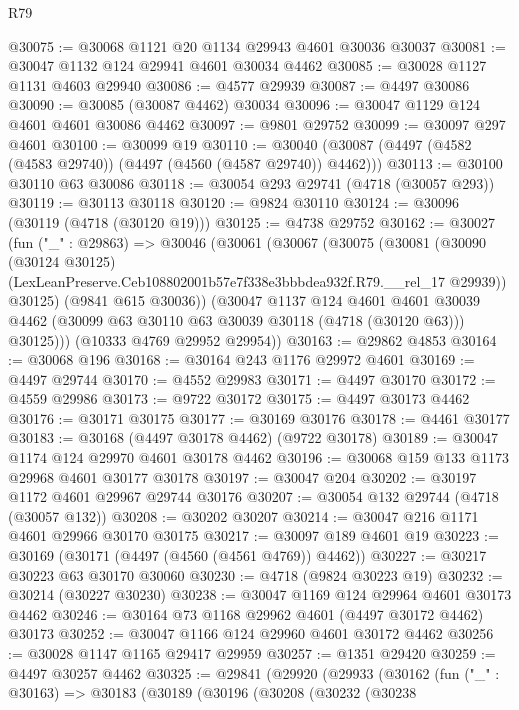 \begin{lexlean}{R79}
\begin{coremodule}
@30075 := @30068 @1121 @20 @1134 @29943 @4601 @30036 @30037
@30081 := @30047 @1132 @124 @29941 @4601 @30034 @4462
@30085 := @30028 @1127 @1131 @4603 @29940
@30086 := @4577 @29939
@30087 := @4497 @30086
@30090 := @30085 (@30087 @4462) @30034
@30096 := @30047 @1129 @124 @4601 @4601 @30086 @4462
@30097 := @9801 @29752
@30099 := @30097 @297 @4601
@30100 := @30099 @19
@30110 := @30040 (@30087 (@4497 (@4582 (@4583 @29740)) (@4497 (@4560 (@4587 @29740)) @4462)))
@30113 := @30100 @30110 @63 @30086
@30118 := @30054 @293 @29741 (@4718 (@30057 @293))
@30119 := @30113 @30118
@30120 := @9824 @30110
@30124 := @30096 (@30119 (@4718 (@30120 @19)))
@30125 := @4738 @29752
@30162 := @30027
    (fun ("_" : @29863) =>
    @30046
      (@30061
        (@30067
          (@30075
            (@30081
              (@30090
                (@30124 @30125)
                (LexLeanPreserve.Ceb108802001b57e7f338e3bbbdea932f.R79.__rel_17 @29939))
              @30125)
            (@9841 @615 @30036))
          (@30047
            @1137
            @124
            @4601
            @4601
            @30039
            @4462
            (@30099 @63 @30110 @63 @30039 @30118 (@4718 (@30120 @63)))
            @30125)))
      (@10333 @4769 @29952 @29954))
@30163 := @29862 @4853
@30164 := @30068 @196
@30168 := @30164 @243 @1176 @29972 @4601
@30169 := @4497 @29744
@30170 := @4552 @29983
@30171 := @4497 @30170
@30172 := @4559 @29986
@30173 := @9722 @30172
@30175 := @4497 @30173 @4462
@30176 := @30171 @30175
@30177 := @30169 @30176
@30178 := @4461 @30177
@30183 := @30168 (@4497 @30178 @4462) (@9722 @30178)
@30189 := @30047 @1174 @124 @29970 @4601 @30178 @4462
@30196 := @30068 @159 @133 @1173 @29968 @4601 @30177 @30178
@30197 := @30047 @204
@30202 := @30197 @1172 @4601 @29967 @29744 @30176
@30207 := @30054 @132 @29744 (@4718 (@30057 @132))
@30208 := @30202 @30207
@30214 := @30047 @216 @1171 @4601 @29966 @30170 @30175
@30217 := @30097 @189 @4601 @19
@30223 := @30169 (@30171 (@4497 (@4560 (@4561 @4769)) @4462))
@30227 := @30217 @30223 @63 @30170 @30060
@30230 := @4718 (@9824 @30223 @19)
@30232 := @30214 (@30227 @30230)
@30238 := @30047 @1169 @124 @29964 @4601 @30173 @4462
@30246 := @30164 @73 @1168 @29962 @4601 (@4497 @30172 @4462) @30173
@30252 := @30047 @1166 @124 @29960 @4601 @30172 @4462
@30256 := @30028 @1147 @1165 @29417 @29959
@30257 := @1351 @29420
@30259 := @4497 @30257 @4462
@30325 := @29841
    (@29920
      (@29933
        (@30162
          (fun ("_" : @30163) =>
          @30183
            (@30189
              (@30196
                (@30208
                  (@30232
                    (@30238

\end{coremodule}
\end{lexlean}
